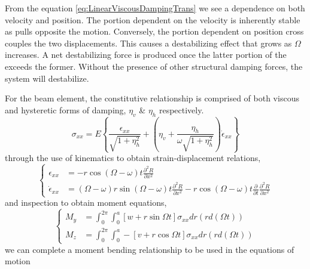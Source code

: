 From the equation \eqref{eq:LinearViscousDampingTrans} we see a dependence on both velocity and position. The portion dependent on the velocity is inherently stable as pulls opposite the motion. Conversely, the portion dependent on position cross couples the two displacements. This causes a destabilizing effect that grows as $ \Omega $ increases. A net destabilizing force is produced once the latter portion of the exceeds the former. Without the presence of other structural damping forces, the system will destabilize.\par
For the beam element, the constitutive relationship\cite{zorzi1977finite} is comprised of both viscous and hysteretic forms of damping, $ \eta_v $ \& $ \eta_h $ respectively.
\begin{equation}\label{eq:LinearViscousHystericConstitutiveRelation}
\sigma_{xx}=E\left\{\frac{\epsilon_{xx}}{\sqrt{1+\eta_h^2}}+\left(\eta_v+\frac{\eta_h}{\omega\sqrt{1+\eta_h^2}}\right)\dot{\epsilon}_{xx}\right\}
\end{equation}
through the use of kinematics to obtain strain-displacement relations,
\begin{equation}\label{eq:straindisplacement}
\left\{\begin{array}{rl}
\epsilon_{xx}&=-r\cos{\left(\Omega-\omega \right)t}\frac{\partial^2 R}{\partial x^2}\\
\dot{\epsilon}_{xx}&=(\Omega-\omega)r\sin{(\Omega-\omega)t}\frac{\partial^2 R}{\partial x^2} - r\cos{(\Omega-\omega)t}\frac{\partial}{\partial t}\frac{\partial^2 R}{\partial x^2}
\end{array}\right.
\end{equation}
and inspection to obtain moment equations,
\begin{equation}\label{eq:momentequations}
\left\{\begin{array}{rl}
M_y &= \int_0^{2\pi}\int_0^a[w+r\sin{\Omega t}]\sigma_{xx}dr(rd(\Omega t))\\
M_z &= \int_0^{2\pi}\int_0^a-[v+r\cos{\Omega t}]\sigma_{xx}dr(rd(\Omega t))
\end{array}\right.
\end{equation}
we can complete a moment bending relationship to be used in the equations of motion
